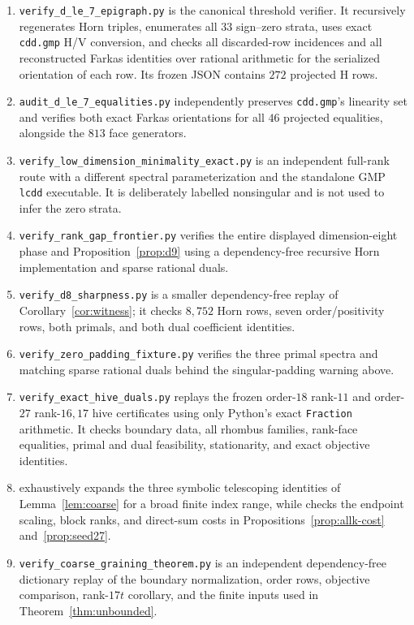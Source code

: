 \documentclass[11pt]{article}
\begin{document}
\begin{enumerate}[leftmargin=2em]
 \item \texttt{verify\_d\_le\_7\_epigraph.py} is the canonical threshold
 verifier.  It recursively regenerates Horn triples, enumerates all $33$
 sign--zero strata, uses exact \texttt{cdd.gmp} H/V conversion, and checks all
 discarded-row incidences and all reconstructed Farkas identities over
 rational arithmetic for the serialized orientation of each row.  Its frozen
 JSON contains $272$ projected H rows.
 \item \texttt{audit\_d\_le\_7\_equalities.py} independently preserves
 \texttt{cdd.gmp}'s linearity set and verifies both exact Farkas orientations
 for all $46$ projected equalities, alongside the $813$ face generators.
 \item \texttt{verify\_low\_dimension\_minimality\_exact.py} is an independent
 full-rank route with a different spectral parameterization and the standalone
 GMP \texttt{lcdd} executable.  It is deliberately labelled nonsingular and
 is not used to infer the zero strata.
 \item \texttt{verify\_rank\_gap\_frontier.py} verifies the entire displayed
 dimension-eight phase and Proposition~\ref{prop:d9} using a dependency-free
 recursive Horn implementation and sparse rational duals.
 \item \texttt{verify\_d8\_sharpness.py} is a smaller dependency-free replay
 of Corollary~\ref{cor:witness}; it checks $8{,}752$ Horn rows, seven
 order/positivity rows, both primals, and both dual coefficient identities.
 \item \texttt{verify\_zero\_padding\_fixture.py} verifies the three primal
 spectra and matching sparse rational duals behind the singular-padding
 warning above.
 \item \texttt{verify\_exact\_hive\_duals.py} replays the frozen order-$18$
 rank-$11$ and order-$27$ rank-$16,17$ hive certificates using only Python's
 exact \texttt{Fraction} arithmetic.  It checks boundary data, all rhombus
 families, rank-face equalities, primal and dual feasibility, stationarity,
 and exact objective identities.
 \item {} exhaustively expands the
 three symbolic telescoping identities of Lemma~\ref{lem:coarse} for a broad
 finite index range, while 
 checks the endpoint scaling, block ranks, and direct-sum costs in
 Propositions~\ref{prop:allk-cost} and~\ref{prop:seed27}.
 \item \texttt{verify\_coarse\_graining\_theorem.py} is an independent
 dependency-free dictionary replay of the boundary normalization, order rows,
 objective comparison, rank-$17t$ corollary, and the finite inputs used in
 Theorem~\ref{thm:unbounded}.
\end{enumerate}
\end{document}
